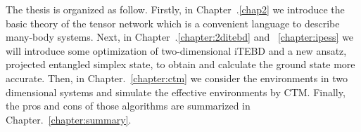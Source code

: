 The thesis is organized as follow. Firstly, in Chapter~.\ref{chap2} we introduce the basic theory of the tensor network which is a convenient language to describe many-body systems. Next, in Chapter~.\ref{chapter:2ditebd} and ~\ref{chapter:ipess} we will introduce some optimization of two-dimensional iTEBD and a new ansatz, projected entangled simplex state, to obtain and calculate the ground state more accurate. Then, in Chapter.~\ref{chapter:ctm} we consider the environments in two dimensional systems and simulate the effective environments by CTM. Finally, the pros and cons of those algorithms are summarized in Chapter.~\ref{chapter:summary}.

